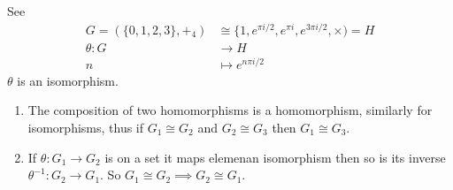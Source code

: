 See 
\begin{align*}
    G = (\{ 0, 1, 2, 3 \}, +_4) &\cong \{1, e^{\pi i/2}, e^{\pi i}, e^{3\pi i/2}, \times) = H \\
    \theta: G &\to H \\
    n &\mapsto e^{n \pi i /2}
\end{align*}
\(\theta\) is an isomorphism.

\begin{lemma} \mbox{} 
\begin{enumerate}
\def\labelenumi{\roman{enumi}.}
  \item The composition of two homomorphisms is a homomorphism, similarly for isomorphisms, thus if \(G_1 \cong G_2\) and \(G_2 \cong G_3\) then \(G_1 \cong G_3\).
  \item
    If \(\theta : G_1 \to G_2\) is on a set it maps elemenan isomorphism then so is its inverse \(\theta^{-1} : G_2 \to G_1\).
    So \(G_1 \cong G_2 \implies G_2 \cong G_1\).
\end{enumerate}

\end{lemma}

